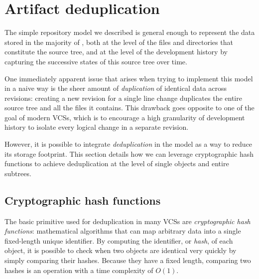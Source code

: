 \section{Artifact deduplication}

The simple repository model we described is general enough to represent the
data stored in the majority of , both at the level of the files
and directories that constitute the source tree, and at the level of the
development history by capturing the successive states of this source tree over
time.

One immediately apparent issue that arises when trying to implement this model
in a naive way is the sheer amount of \emph{duplication} of identical data
across revisions: creating a new revision for a single line change duplicates
the entire source tree and all the files it contains. This drawback goes
opposite to one of the goal of modern \glspl{VCS}, which is to encourage a high
granularity of development history to isolate every logical change in a
separate revision.

However, it is possible to integrate \emph{deduplication} in the model as a way
to reduce its storage footprint. This section details how we can leverage
cryptographic hash functions to achieve deduplication at the level of single
objects and entire subtrees.

\subsection{Cryptographic hash functions}

The basic primitive used for deduplication in many \glspl{VCS} are
\emph{cryptographic hash functions}: mathematical algorithms that can map
arbitrary data into a single fixed-length unique identifier. By computing the
identifier, or \emph{hash}, of each object, it is possible to check when two
objects are identical very quickly by simply comparing their hashes. Because
they have a fixed length, comparing two hashes is an operation with a time
complexity of $O(1)$.

